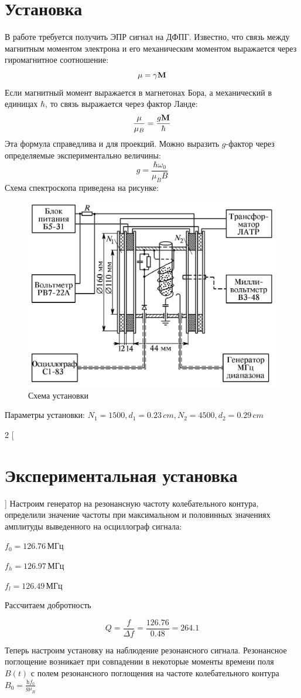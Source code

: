 \documentclass[a4paper,12pt]{article}
\theoremstyle{plain} %
\theoremstyle{definition} %
\theoremstyle{remark} %
\begin{document}
	\section{Установка}
        В работе требуется получить ЭПР сигнал на ДФПГ. Известно, что связь между магнитным моментом электрона и его механическим моментом выражается через гиромагнитное соотношение:
        \begin{equation}
            \bf{\mu} = \gamma\bf{M}
        \end{equation}
        Если магнитный момент выражается в магнетонах Бора, а механический в единицах $\hbar$, то связь выражается через фактор Ланде:
        \begin{equation}
            \frac{\bf{\mu}}{\mu_B} = \frac{g\bf{M}}{\hbar}
        \end{equation}
        Эта формула справедлива и для проекций. Можно выразить $g$-фактор через определяемые экспериментально величины:
        \begin{equation}
            g = \frac{\hbar\omega_0}{\mu_B B}
        \end{equation}
        Схема спектроскопа приведена на рисунке:
        \begin{figure}[h!]
			\centering
			\includegraphics[width=0.5\linewidth]{exp}
			\caption{Схема установки}
		\end{figure}        
		
		Параметры установки: $N_1 = 1500, d_1 = 0.23\,cm, N_2 = 4500, d_2=0.29\,cm$
	\newpage
\begin{multicols}{2}
[
\section{Экспериментальная установка}
]
    Настроим генератор на резонансную частоту колебательного контура, определили значение частоты при максимальном и половинных значениях амплитуды выведенного на осциллограф сигнала:
	
	$f_{0} = 126.76 \, \text{МГц}$
	
	$f_{h} = 126.97 \, \text{МГц}$
	
	$f_{l} = 126.49 \, \text{МГц}$
	
	Рассчитаем добротность
    
    $$ Q = \frac{f}{\Delta f} = \frac{126.76}{0.48} = 264.1 $$
    
    Теперь настроим установку на наблюдение резонансного сигнала. Резонансное поглощение возникает при совпадении в некоторые моменты времени поля $B(t)$ с полем резонансного поглощения на частоте колебательного контура $B_0=\frac{\mathrm{h}f_0}{g\mu_B}$
\end{multicols}
\end{document}
